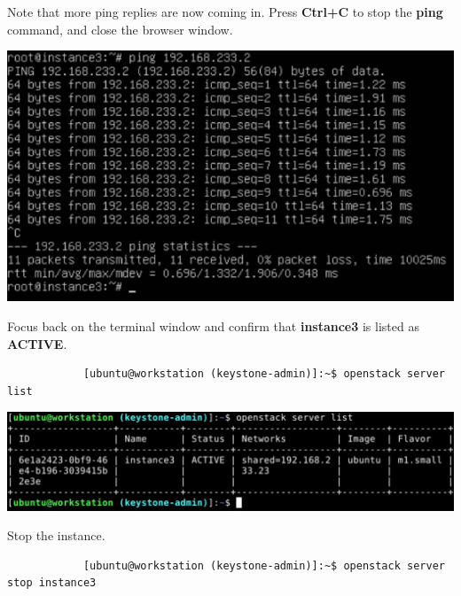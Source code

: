 \documentclass[letterpaper, 12pt]{article}
\begin{document}
\begin{enumerate}
    \begin{labstep}
        Note that more ping replies are now coming in.
        Press \textbf{Ctrl+C} to stop the \textbf{ping} command, and close the browser window.

        \begin{center}
            \includegraphics[width=\linewidth]{images/part4/step15.png}
        \end{center}
    \end{labstep}

    \begin{labstep}
        Focus back on the terminal window and confirm that \textbf{instance3} is listed as \textbf{ACTIVE}.
        \begin{lstlisting}
            [ubuntu@workstation (keystone-admin)]:~$ openstack server list
        \end{lstlisting}

        \begin{center}
            \includegraphics[width=\linewidth]{images/part4/step16.png}
        \end{center}
    \end{labstep}

    \begin{labstep}
        Stop the instance.
        \begin{lstlisting}
            [ubuntu@workstation (keystone-admin)]:~$ openstack server stop instance3
        \end{lstlisting}


\end{labstep}
\end{enumerate}
\end{document}
